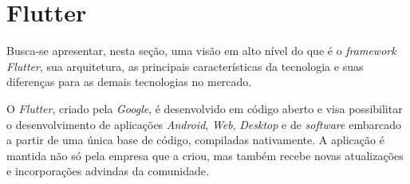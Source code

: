 \section[\textit{Flutter}]{Flutter}
Busca-se apresentar, nesta seção, uma visão em alto nível do que é o \textit{framework Flutter}, sua arquitetura, as principais características da tecnologia e suas diferenças para as demais tecnologias no mercado.

O \textit{Flutter}, criado pela \textit{Google}, é desenvolvido em código aberto e visa possibilitar o desenvolvimento de aplicações \textit{Android}, \textit{Web}, \textit{Desktop} e de \textit{software} embarcado a partir de uma única base de código, compiladas nativamente. A aplicação é mantida não só pela empresa que a criou, mas também recebe novas atualizações e incorporações advindas da comunidade.





